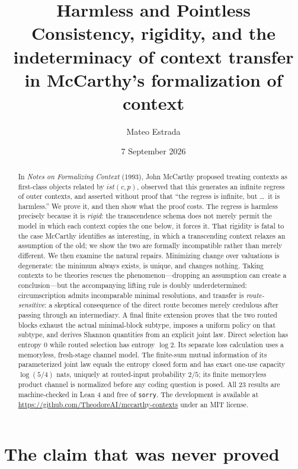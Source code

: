 \documentclass[11pt]{article}
\title{Harmless and Pointless\\[0.3em]
  \large Consistency, rigidity, and the indeterminacy of context transfer\\
  in McCarthy's formalization of context}
\author{Mateo Estrada}
\date{7 September 2026}
\theoremstyle{plain}
\theoremstyle{remark}
\newcommand{\ist}{\mathit{ist}}
\begin{document}
\maketitle

\begin{abstract}
In \emph{Notes on Formalizing Context} (1993), John McCarthy proposed treating
contexts as first-class objects related by $\ist(c,p)$, observed that this
generates an infinite regress of outer contexts, and asserted without proof that
``the regress is infinite, but \ldots\ it is harmless.'' We prove it, and then
show what the proof costs. The regress is harmless precisely because it is
\emph{rigid}: the transcendence schema does not merely permit the model in which
each context copies the one below, it forces it. That rigidity is fatal to the
case McCarthy identifies as interesting, in which a transcending context relaxes
an assumption of the old; we show the two are formally incompatible rather than
merely different. We then examine the natural repairs. Minimizing change over
valuations is degenerate: the minimum always exists, is unique, and changes
nothing. Taking contexts to be theories rescues the phenomenon---dropping an
assumption can create a conclusion---but the accompanying lifting rule is doubly
underdetermined: circumscription admits incomparable minimal resolutions, and
transfer is \emph{route-sensitive}: a skeptical consequence of the direct route
becomes merely credulous after passing through an intermediary. A final finite
extension proves that the two routed blocks exhaust the actual minimal-block
subtype, imposes a uniform policy on that subtype, and derives Shannon
quantities from an explicit joint law.  Direct selection has entropy $0$ while
routed selection has entropy $\log 2$.  Its separate loss calculation uses a
memoryless, fresh-stage channel model.  The finite-sum mutual information of
its parameterized joint law equals the entropy closed form and has exact
one-use capacity $\log(5/4)$ nats, uniquely at routed-input probability $2/5$;
its finite memoryless product channel is normalized before any coding question
is posed.  All 23 results are machine-checked in Lean 4 and free of
\texttt{sorry}. The development is available at
\url{https://github.com/TheodoreAI/mccarthy-contexts} under an MIT license.
\end{abstract}

\section{The claim that was never proved}
\end{document}
